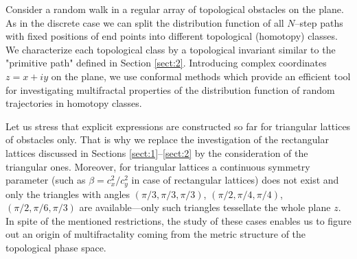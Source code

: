 Consider a random walk in a regular array of topological obstacles on the
plane. As in the discrete case we can split the distribution function of all
$N$--step paths with fixed positions of end points into  different topological
(homotopy) classes. We characterize each topological class by a topological invariant similar to the "primitive path" 
defined in Section \ref{sect:2}. Introducing complex coordinates $z=x+iy$ on the plane, we use conformal methods which provide an efficient tool for 
investigating multifractal properties of the distribution function of random trajectories in homotopy classes.

Let us stress that explicit expressions are constructed so far for triangular
lattices of obstacles only. That is why we replace the investigation of the
rectangular lattices discussed in Sections \ref{sect:1}--\ref{sect:2} by the
consideration of the triangular ones. Moreover, for triangular lattices a
continuous symmetry parameter (such as $\beta=c_x^2/c_y^2$ in case of
rectangular lattices) does not exist and only the triangles with angles
$(\pi/3,\pi/3,\pi/3)$, $(\pi/2,\pi/4,\pi/4)$, $(\pi/2,\pi/6,\pi/3)$ are
available---only such triangles tessellate the whole plane $z$. In spite of the
mentioned restrictions, the study of these cases enables us to figure out an origin of multifractality coming from the metric structure of the
topological phase space.

